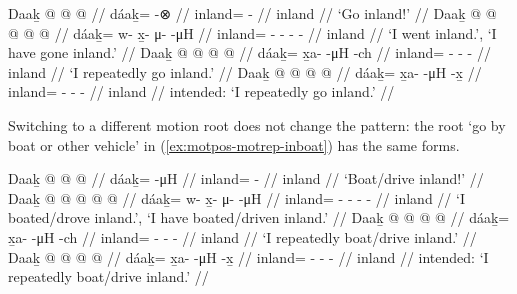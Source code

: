 \documentclass[12pt,letterpaper,oneside,article]{memoir}
\begin{document}
\pex\label{ex:motpos-motrep-inland}%
\a\label{ex:motpos-motrep-inland-imp}%
%
\begingl
	\gla	Daaḵ @  @ {} @ {} //
	\glb	dáaḵ= {}  -⊗ //
	\glc	inland= \·  - //
	\gld	inland  {} {} //
	\glft	‘Go inland!’
		//
\endgl
\a\label{ex:motpos-motrep-inland-pfv}%
%
\begingl
	\gla	Daaḵ @  @ {} @ {} @ {} @ {} //
	\glb	dáaḵ= w- x̱- μ-  -μH //
	\glc	inland= - - -  - //
	\gld	inland  {} {} {} {} //
	\glft	‘I went inland.’, ‘I have gone inland.’
		//
\endgl
\a\label{ex:motpos-motrep-inland-repch}%
%
\begingl
	\gla	Daaḵ @  @ {} @ {} @ {} //
	\glb	dáaḵ= x̱a-  -μH -ch //
	\glc	inland= -  - - //
	\gld	inland  {} {} {} //
	\glft	‘I repeatedly go inland.’
		//
\endgl
\a\label{ex:motpos-motrep-inland-repxh}%
\ljudge{*}%
%
\begingl
	\gla	Daaḵ @  @ {} @ {} @ {} //
	\glb	dáaḵ= x̱a-  -μH -x̱ //
	\glc	inland= -  - - //
	\gld	inland  {} {} {} //
	\glft	intended: ‘I repeatedly go inland.’
		//
\endgl
\xe

Switching to a different motion root does not change the pattern:
the root  ‘go by boat or other vehicle’ in (\ref{ex:motpos-motrep-inboat}) has the same forms.

\pex\label{ex:motpos-motrep-inboat}%
\a\label{ex:motpos-motrep-inboat-imp}%
%
\begingl
	\gla	Daaḵ @  @ {} @ {} //
	\glb	dáaḵ= {}  -μH //
	\glc	inland= \·  - //
	\gld	inland  {} {} //
	\glft	‘Boat/drive inland!’
		//
\endgl
\a\label{ex:motpos-motrep-inboat-pfv}%
%
\begingl
	\gla	Daaḵ @  @ {} @ {} @ {} @ {} //
	\glb	dáaḵ= w- x̱- μ-  -μH //
	\glc	inland= - - -  - //
	\gld	inland  {} {} {} {} //
	\glft	‘I boated/drove inland.’, ‘I have boated/driven inland.’
		//
\endgl
\a\label{ex:motpos-motrep-inboat-repch}%
%
\begingl
	\gla	Daaḵ @  @ {} @ {} @ {} //
	\glb	dáaḵ= x̱a-  -μH -ch //
	\glc	inland= -  - - //
	\gld	inland  {} {} {} //
	\glft	‘I repeatedly boat/drive inland.’
		//
\endgl
\a\label{ex:motpos-motrep-inboat-repxh}%
\ljudge{*}%
%
\begingl
	\gla	Daaḵ @  @ {} @ {} @ {} //
	\glb	dáaḵ= x̱a-  -μH -x̱ //
	\glc	inland= -  - - //
	\gld	inland  {} {} {} //
	\glft	intended: ‘I repeatedly boat/drive inland.’
		//
\endgl
\xe
\end{document}
